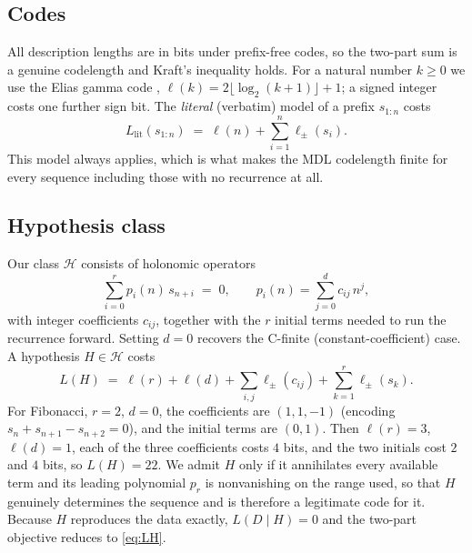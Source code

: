 \documentclass[10pt]{article}
\theoremstyle{definition}
\theoremstyle{plain}
\newcommand{\Llit}{L_{\mathrm{lit}}}
\newcommand{\Prec}{\mathcal{H}}
\begin{document}
\subsection{Codes}

All description lengths are in bits under prefix-free codes, so the two-part
sum is a genuine codelength and Kraft's inequality holds. For a natural number
$k \ge 0$ we use the Elias gamma code \citep{elias1975},
$\ell(k) = 2\lfloor \log_2 (k{+}1)\rfloor + 1$; a signed integer costs one
further sign bit. The \emph{literal} (verbatim) model of a prefix
$s_{1:n}$ costs
\begin{equation}
\Llit(s_{1:n}) \;=\; \ell(n) + \sum_{i=1}^{n} \ell_{\pm}(s_i).
\end{equation}
This model always applies, which is what makes the MDL codelength finite for
every sequence including those with no recurrence at all.

\subsection{Hypothesis class}

Our class $\Prec$ consists of holonomic operators
\begin{equation}
\sum_{i=0}^{r} p_i(n)\, s_{n+i} \;=\; 0,
\qquad p_i(n) = \sum_{j=0}^{d} c_{ij}\, n^{j},
\label{eq:ansatz}
\end{equation}
with integer coefficients $c_{ij}$, together with the $r$ initial terms needed
to run the recurrence forward. Setting $d = 0$ recovers the C-finite
(constant-coefficient) case. A hypothesis $H \in \Prec$ costs
\begin{equation}
L(H) \;=\; \ell(r) + \ell(d) + \sum_{i,j} \ell_{\pm}(c_{ij})
           + \sum_{k=1}^{r} \ell_{\pm}(s_k).
\label{eq:LH}
\end{equation}
For Fibonacci, $r=2$, $d=0$, the coefficients are $(1,1,-1)$ (encoding
$s_n + s_{n+1} - s_{n+2} = 0$), and the initial terms are $(0,1)$. Then
$\ell(r)=3$, $\ell(d)=1$, each of the three coefficients costs $4$ bits, and
the two initials cost $2$ and $4$ bits, so $L(H)=22$. We admit $H$ only if it
annihilates every available term and its leading polynomial $p_r$ is
nonvanishing on the range used, so that $H$ genuinely determines the sequence
and is therefore a legitimate code for it. Because $H$ reproduces the data
exactly, $L(D\mid H) = 0$ and the two-part objective reduces to
\eqref{eq:LH}.
\end{document}
